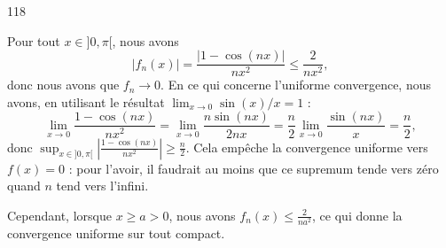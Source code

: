 

\begin{corrige}{118}

	Pour tout $x\in]0,\pi[$, nous avons
	\begin{equation}
		| f_n(x) |=\frac{ | 1-\cos(nx) | }{ nx^2 }\leq\frac{ 2 }{ nx^2 },
	\end{equation}
	donc nous avons que $f_n\to 0$. En ce qui concerne l'uniforme convergence, nous avons, en utilisant le résultat $\lim_{x\to 0}\sin(x)/x=1$ :
	\begin{equation}
		\lim_{x\to 0}\frac{ 1-\cos(nx) }{ nx^2 }=\lim_{x\to 0}\frac{ n\sin(nx) }{ 2nx }=\frac{ n }{ 2 }\lim_{x\to 0}\frac{ \sin(nx) }{ x }=\frac{n}{ 2 },
	\end{equation}
	donc $\sup_{x\in ]0,\pi[}\left| \frac{ 1-\cos(nx) }{ nx^2 }\right|\geq \frac{n}{ 2 }$. Cela empêche la convergence uniforme vers $f(x)=0$ : pour l'avoir, il faudrait au moins que ce supremum tende vers zéro quand $n$ tend vers l'infini.

	Cependant, lorsque $x\geq a>0$, nous avons $f_n(x)\leq\frac{ 2 }{ na^2 }$, ce qui donne la convergence uniforme sur tout compact.

\end{corrige}
